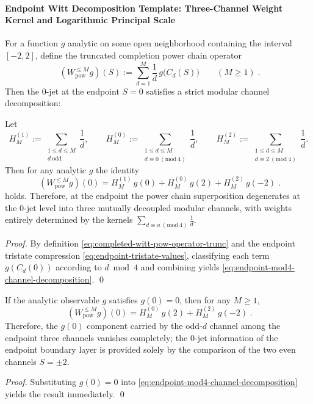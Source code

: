 \paragraph{Endpoint Witt Decomposition Template: Three-Channel Weight Kernel and Logarithmic Principal Scale}
For a function \(g\) analytic on some open neighborhood containing the interval \([-2,2]\), define the truncated completion power chain operator
\begin{equation}\label{eq:completed-witt-pow-operator-trunc}
\boxed{\;
(W_{\mathrm{pow}}^{\le M}g)(S):=\sum_{d=1}^{M}\frac{1}{d}\,g\!\bigl(C_d(S)\bigr)\qquad(M\ge 1)\; }.
\end{equation}
Then the \(0\)-jet at the endpoint \(S=0\) satisfies a strict modular channel decomposition:

\begin{proposition}[Endpoint Three-Channel Decomposition: Truncated Power Chain at \texorpdfstring{$S=0$}{S=0} Modulo \texorpdfstring{$4$}{4} Grouping Identity]\label{prop:endpoint-mod4-channel-decomposition}
Let
\[
H_M^{(1)}:=\sum_{\substack{1\le d\le M\\ d\ \mathrm{odd}}}\frac1d,\qquad
H_M^{(0)}:=\sum_{\substack{1\le d\le M\\ d\equiv 0\ (\mathrm{mod}\ 4)}}\frac1d,\qquad
H_M^{(2)}:=\sum_{\substack{1\le d\le M\\ d\equiv 2\ (\mathrm{mod}\ 4)}}\frac1d.
\]
Then for any analytic \(g\) the identity
\begin{equation}\label{eq:endpoint-mod4-channel-decomposition}
\boxed{\;
(W_{\mathrm{pow}}^{\le M}g)(0)
=
H_M^{(1)}\,g(0)
+H_M^{(0)}\,g(2)
+H_M^{(2)}\,g(-2)\; }.
\end{equation}
holds. Therefore, at the endpoint the power chain superposition degenerates at the \(0\)-jet level into three mutually decoupled modular channels, with weights entirely determined by the kernels \(\sum_{d\equiv a\ (\mathrm{mod}\ 4)}\frac1d\).
\end{proposition}
\begin{proof}
By definition \eqref{eq:completed-witt-pow-operator-trunc} and the endpoint tristate compression \eqref{eq:endpoint-tristate-values},
classifying each term \(g(C_d(0))\) according to \(d\bmod 4\) and combining yields \eqref{eq:endpoint-mod4-channel-decomposition}. \qed
\end{proof}

\begin{corollary}\label{cor:endpoint-odd-channel-vanish}
If the analytic observable \(g\) satisfies \(g(0)=0\), then for any \(M\ge 1\),
\[
\boxed{\;
(W_{\mathrm{pow}}^{\le M}g)(0)=H_M^{(0)}\,g(2)+H_M^{(2)}\,g(-2)\; }.
\]
Therefore, the \(g(0)\) component carried by the odd-\(d\) channel among the endpoint three channels vanishes completely; the \(0\)-jet information of the endpoint boundary layer is provided solely by the comparison of the two even channels \(S=\pm 2\).
\end{corollary}
\begin{proof}
Substituting \(g(0)=0\) into \eqref{eq:endpoint-mod4-channel-decomposition} yields the result immediately. \qed
\end{proof}

